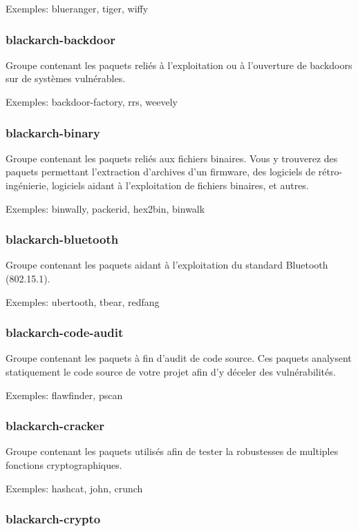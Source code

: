 \documentclass[a4paper, oneside, 11pt]{book}
\begin{document}
Exemples: blueranger, tiger, wiffy

\subsubsection{blackarch-backdoor}


Groupe contenant les paquets reliés à l'exploitation ou à l'ouverture de
backdoors sur de systèmes vulnérables.

Exemples: backdoor-factory, rrs, weevely

\subsubsection{blackarch-binary}

Groupe contenant les paquets reliés aux fichiers binaires. Vous y trouverez des
paquets permettant l'extraction d'archives d'un firmware, des logiciels de
rétro-ingénierie, logiciels aidant à l'exploitation de fichiers binaires, et
autres.

Exemples: binwally, packerid, hex2bin, binwalk

\subsubsection{blackarch-bluetooth}

Groupe contenant les paquets aidant à l'exploitation du standard Bluetooth
(802.15.1).

Exemples: ubertooth, tbear, redfang

\subsubsection{blackarch-code-audit}

Groupe contenant les paquets à fin d'audit de code source. Ces paquets analysent
statiquement le code source de votre projet afin d'y déceler des vulnérabilités.

Exemples: flawfinder, pscan

\subsubsection{blackarch-cracker}

Groupe contenant les paquets utilisés afin de tester la robustesses de multiples
fonctions cryptographiques.

Exemples: hashcat, john, crunch

\subsubsection{blackarch-crypto}
\end{document}

